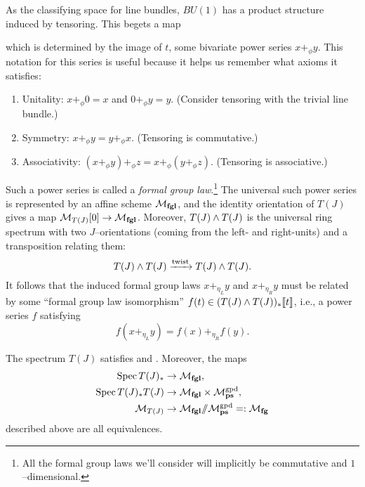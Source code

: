 As the classifying space for line bundles, $BU(1)$ has a product structure induced by tensoring.  This begets a map
\begin{center}
\end{center}
which is determined by the image of $t$, some bivariate power series $x +_\phi y$.  This notation for this series is useful because it helps us remember what axioms it satisfies:
\begin{enumerate}
\item Unitality: $x +_\phi 0 = x$ and $0 +_\phi y = y$.  (Consider tensoring with the trivial line bundle.)
\item Symmetry: $x +_\phi y = y +_\phi x$.  (Tensoring is commutative.)
\item Associativity: $(x +_\phi y) +_\phi z = x +_\phi (y +_\phi z)$.  (Tensoring is associative.)
\end{enumerate}
Such a power series is called a \textit{formal group law}.\footnote{All the formal group laws we'll consider will implicitly be commutative and $1$--dimensional.}  The universal such power series is represented by an affine scheme $\mathcal{M}_{\mathbf{fgl}}$, and the identity orientation of $T(J)$ gives a map $\mathcal{M}_{T(J)}[0] \to \mathcal{M}_{\mathbf{fgl}}$.  Moreover, $T(J) \wedge T(J)$ is the universal ring spectrum with two $J$--orientations (coming from the left- and right-units) and a transposition relating them: \[T(J) \wedge T(J) \xrightarrow{\text{twist}} T(J) \wedge T(J).\]  It follows that the induced formal group laws $x +_{\eta_L} y$ and $x +_{\eta_R} y$ must be related by some ``formal group law isomorphism'' $f(t) \in (T(J) \wedge T(J))_*\llbracket{t}\rrbracket$, i.e., a power series $f$ satisfying \[f(x +_{\eta_L} y) = f(x) +_{\eta_R} f(y).\]

\begin{theorem}
The spectrum $T(J)$ satisfies {\FH} and \CH.  Moreover, the maps
\begin{align*}
\operatorname{Spec} T(J)_* & \to \mathcal{M}_{\mathbf{fgl}}, \\
\operatorname{Spec} T(J)_* T(J) & \to \mathcal{M}_{\mathbf{fgl}} \times \mathcal{M}_{\mathbf{ps}}^{\mathrm{gpd}}, \\
\mathcal{M}_{T(J)} & \to \mathcal{M}_{\mathbf{fgl}} /\!\!/ \mathcal{M}_{\mathbf{ps}}^{\mathrm{gpd}} =: \mathcal{M}_{\mathbf{fg}}
\end{align*}
described above are all equivalences.
\end{theorem}

